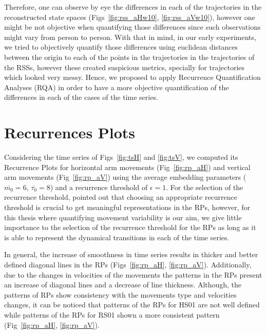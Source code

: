 Therefore, one can observe by eye the differences in each of the trajectories 
in the reconstructed state spaces 
(Figs~\ref{fig:rss_aHw10}, \ref{fig:rss_aVw10}), 
however one might be not objective when quantifying those differences 
since such observations might vary from person to person.
With that in mind, in our early experiments, we tried to objectively 
quantify those differences using euclidean distances between 
the origin to each of the points in the trajectories in the trajectories of 
the RSSs, however these created suspicious metrics, specially 
for trajectories which looked very messy.
Hence, we proposed to apply Recurrence Quantification Analyses (RQA) 
in order to have a more objective quantification of the differences 
in each of the cases of the time series.

\newpage
\section{Recurrences Plots}
Considering the time series of Figs~\ref{fig:tsH} and \ref{fig:tsV}, 
we computed its Recurrence Plots for horizontal arm movements 
(Fig~\ref{fig:rp_aH}) and vertical arm movements (Fig~\ref{fig:rp_aV}) 
using the average embedding parameters 
($\overline{m_0}=6$, $\overline{\tau_0}=8$) 
and a recurrence threshold of $\epsilon=1$. 
For the selection of the recurrence threshold,
\cite{marwan2011} pointed out that choosing an appropriate 
recurrence threshold is crucial to get meaningful representations in the RPs, 
however, for this thesis where quantifying movement variability is our aim,
we give little importance to the selection of the recurrence threshold 
for the RPs as long as it is able to represent the dynamical transitions 
in each of the time series.

In general, the increase of smoothness in time series results in thicker 
and better defined diagonal lines in the RPs 
(Figs~\ref{fig:rp_aH}, \ref{fig:rp_aV}).
Additionally, due to the changes in velocities of the movements 
the patterns in the RPs present an increase of diagonal lines 
and a decrease of line thickness.
Although, the patterns of RPs show consistency with the movements type 
and velocities changes, it can be noticed that patterns of the RPs for 
HS01 are not well defined while patterns of the RPs for RS01 
shown a more consistent pattern (Fig~\ref{fig:rp_aH}, \ref{fig:rp_aV}). 

